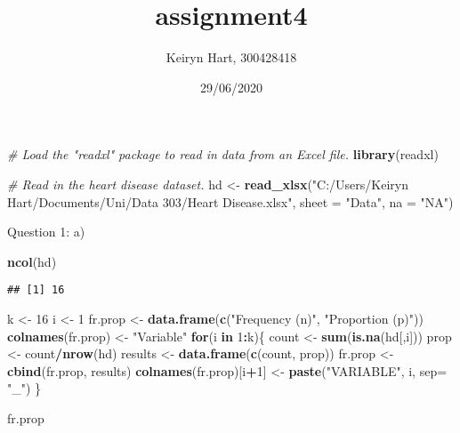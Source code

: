 \documentclass[
]{article}
\title{assignment4}
\author{Keiryn Hart, 300428418}
\date{29/06/2020}
\newenvironment{Shaded}{\begin{snugshade}}{\end{snugshade}}
\newcommand{\CommentTok}[1]{\textcolor[rgb]{0.56,0.35,0.01}{\textit{#1}}}
\newcommand{\ControlFlowTok}[1]{\textcolor[rgb]{0.13,0.29,0.53}{\textbf{#1}}}
\newcommand{\DataTypeTok}[1]{\textcolor[rgb]{0.13,0.29,0.53}{#1}}
\newcommand{\DecValTok}[1]{\textcolor[rgb]{0.00,0.00,0.81}{#1}}
\newcommand{\KeywordTok}[1]{\textcolor[rgb]{0.13,0.29,0.53}{\textbf{#1}}}
\newcommand{\NormalTok}[1]{#1}
\newcommand{\OperatorTok}[1]{\textcolor[rgb]{0.81,0.36,0.00}{\textbf{#1}}}
\newcommand{\StringTok}[1]{\textcolor[rgb]{0.31,0.60,0.02}{#1}}
\begin{document}
\maketitle

\begin{Shaded}
\begin{Highlighting}[]
\CommentTok{# Load the "readxl" package to read in data from an Excel file.}
\KeywordTok{library}\NormalTok{(readxl)}

\CommentTok{# Read in the heart disease dataset.}
\NormalTok{hd <-}\StringTok{ }\KeywordTok{read_xlsx}\NormalTok{(}\StringTok{"C:/Users/Keiryn Hart/Documents/Uni/Data 303/Heart Disease.xlsx"}\NormalTok{, }\DataTypeTok{sheet =} \StringTok{"Data"}\NormalTok{, }\DataTypeTok{na =} \StringTok{"NA"}\NormalTok{)}
\end{Highlighting}
\end{Shaded}

Question 1: a)

\begin{Shaded}
\begin{Highlighting}[]
\KeywordTok{ncol}\NormalTok{(hd)}
\end{Highlighting}
\end{Shaded}

\begin{verbatim}
## [1] 16
\end{verbatim}

\begin{Shaded}
\begin{Highlighting}[]
\NormalTok{k <-}\StringTok{ }\DecValTok{16}
\NormalTok{i <-}\StringTok{ }\DecValTok{1}
\NormalTok{fr.prop <-}\StringTok{ }\KeywordTok{data.frame}\NormalTok{(}\KeywordTok{c}\NormalTok{(}\StringTok{"Frequency (n)"}\NormalTok{, }\StringTok{"Proportion (p)"}\NormalTok{))}
\KeywordTok{colnames}\NormalTok{(fr.prop) <-}\StringTok{ "Variable"}
\ControlFlowTok{for}\NormalTok{(i }\ControlFlowTok{in} \DecValTok{1}\OperatorTok{:}\NormalTok{k)\{}
\NormalTok{  count <-}\StringTok{ }\KeywordTok{sum}\NormalTok{(}\KeywordTok{is.na}\NormalTok{(hd[,i]))}
\NormalTok{  prop <-}\StringTok{ }\NormalTok{count}\OperatorTok{/}\KeywordTok{nrow}\NormalTok{(hd)}
\NormalTok{  results <-}\StringTok{ }\KeywordTok{data.frame}\NormalTok{(}\KeywordTok{c}\NormalTok{(count, prop))}
\NormalTok{  fr.prop <-}\StringTok{ }\KeywordTok{cbind}\NormalTok{(fr.prop, results)}
  \KeywordTok{colnames}\NormalTok{(fr.prop)[i}\OperatorTok{+}\DecValTok{1}\NormalTok{] <-}\StringTok{ }\KeywordTok{paste}\NormalTok{(}\StringTok{"VARIABLE"}\NormalTok{, i, }\DataTypeTok{sep=} \StringTok{"_"}\NormalTok{)}
\NormalTok{\}}

\NormalTok{fr.prop}
\end{Highlighting}
\end{Shaded}
\end{document}
